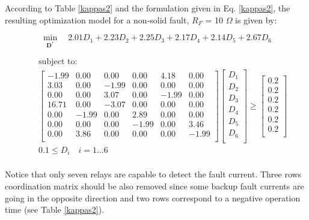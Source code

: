 \documentclass[letterpaper, 10 pt, conference]{IEEEtran}
\begin{document}
 According to Table \ref{kappas2} and the formulation given in Eq. \ref{kappas2}, the resulting optimization model for  a non-solid fault, $R_F$ = 10 $\Omega$  is given by:

\scriptsize
\begin{equation}\nonumber
   \min_{\mathbf{D^*}}\quad 2.01 D_1+2.23   D_2+2.25  D_3+2.17  D_4+ 2.14   D_5+2.67 D_6
\end{equation}

\begin{eqnarray}\nonumber
&&\mbox{subject to}:\\\nonumber
&&  \begin{bmatrix}
-1.99	&	0.00	&	0.00	&	0.00	&	4.18	&	0.00	\\	
3.03	&	0.00	&	-1.99	&	0.00	&	0.00	&	0.00	\\	
0.00	&	0.00	&	3.07	&	0.00	&	-1.99	&	0.00	\\	
16.71	&	0.00	&	-3.07	&	0.00	&	0.00	&	0.00	\\	
0.00	&	-1.99	&	0.00	&	2.89	&	0.00	&	0.00	\\	
0.00	&	0.00	&	0.00	&	-1.99	&	0.00	&	3.46	\\	
0.00	&	3.86	&	0.00	&	0.00	&	0.00	&	-1.99	\\	

  \end{bmatrix}
  \begin{bmatrix} \nonumber
  D_1\\D_2\\D_3\\D_4\\D_5\\D_6\\
  \end{bmatrix}
\ge  \begin{bmatrix} \nonumber
  0.2\\0.2\\0.2\\0.2\\0.2\\0.2\\
  \end{bmatrix}\\\nonumber
& & 0.1\le{D_i}\quad i=1...6\\\nonumber
 \end{eqnarray}
\normalsize

Notice that only seven relays are capable to detect the fault current.  Three rows coordination matrix should be also removed since some backup fault currents are going in the opposite direction and two rows correspond to a negative operation time (see Table \ref{kappas2}).
\end{document}
